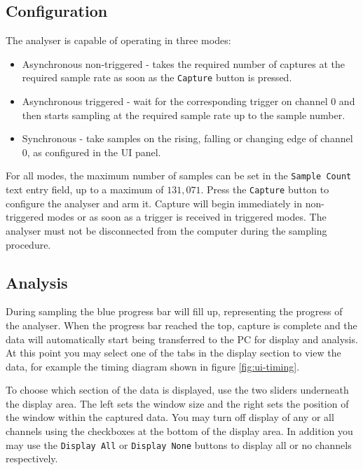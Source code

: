 \documentclass[11pt,twocolumn]{article}
\begin{document}
\subsection{Configuration}
   The analyser is capable of operating in three modes: 
   \begin{itemize}
        \item Asynchronous non-triggered - takes the required number of
            captures at the required sample rate as soon as the
            \texttt{Capture} button is pressed.
        \item Asynchronous triggered - wait for the corresponding trigger on
            channel 0 and then starts sampling at the required sample rate up
            to the sample number.
        \item Synchronous - take samples on the rising, falling or changing
            edge of channel 0, as configured in the UI panel.
    \end{itemize}

    For all modes, the maximum number of samples can be set in the
    \texttt{Sample Count} text entry field, up to a maximum of $131,071$. 
    Press the \texttt{Capture} button to configure the analyser and arm it.
    Capture will begin immediately in non-triggered modes or as soon as a
    trigger is received in triggered modes. The analyser must not be
    disconnected from the computer during the sampling procedure.

\subsection{Analysis}
    During sampling the blue progress bar will fill up, representing the
    progress of the analyser. When the progress bar reached the top, capture is
    complete and the data will automatically start being transferred to the PC
    for display and analysis. At this point you may select one of the
    tabs in the display section to view the data, for example the timing
    diagram shown in figure \ref{fig:ui-timing}.

    To choose which section of the data is displayed, use the two sliders 
    underneath the display area. The left sets the window size and the right
    sets the position of the window within the captured data. You may turn 
    off display of any or all channels using the checkboxes at the
    bottom of the display area. In addition you may use the \texttt{Display
    All} or \texttt{Display None} buttons to display all or no channels
    respectively.
\end{document}

